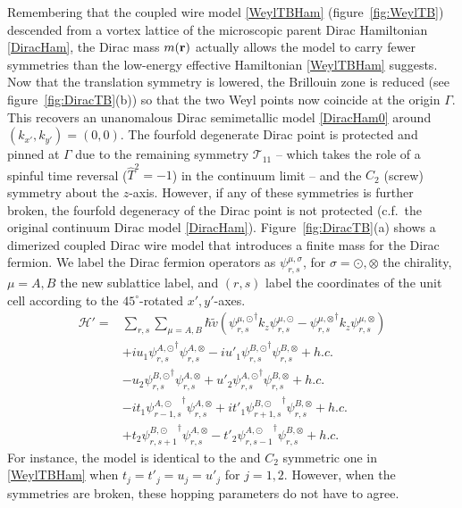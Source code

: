 Remembering that the coupled wire model \eqref{WeylTBHam} (figure~\ref{fig:WeylTB}) descended from a vortex lattice of the microscopic parent Dirac Hamiltonian \eqref{DiracHam}, the Dirac mass $m({\bf r})$ actually allows the model to carry fewer symmetries than the low-energy effective Hamiltonian \eqref{WeylTBHam} suggests. Now that the translation symmetry is lowered, the Brillouin zone is reduced (see figure~\ref{fig:DiracTB}(b)) so that the two Weyl points now coincide at the origin $\Gamma$. This recovers an unanomalous Dirac semimetallic model \eqref{DiracHam0} around $(k_{x'},k_{y'})=(0,0)$. The fourfold degenerate Dirac point is protected and pinned at $\Gamma$ due to the remaining \AFTR symmetry $\mathcal{T}_{11}$ -- which takes the role of a spinful time reversal ($\hat{T}^2=-1$) in the continuum limit -- and the $C_2$ (screw) symmetry about the $z$-axis. However, if any of these symmetries is further broken, the fourfold degeneracy of the Dirac point is not protected (c.f.~the original continuum Dirac model \eqref{DiracHam}). Figure~\ref{fig:DiracTB}(a) shows a dimerized coupled Dirac wire model that introduces a finite mass for the Dirac fermion. We label the Dirac fermion operators as $\psi_{r,s}^{\mu,\sigma}$, for $\sigma=\odot,\otimes$ the chirality, $\mu=A,B$ the new sublattice label, and $(r,s)$ label the coordinates of the unit cell according to the $45^\circ$-rotated $x',y'$-axes. \begin{align}\mathcal{H}'=&\sum_{r,s}\sum_{\mu=A,B}\hbar\tilde{v}\left({\psi_{r,s}^{\mu,\odot}}^\dagger k_z\psi_{r,s}^{\mu,\odot}-{\psi_{r,s}^{\mu,\otimes}}^\dagger k_z\psi_{r,s}^{\mu,\otimes}\right)\nonumber\\&+iu_1{\psi_{r,s}^{A,\odot}}^\dagger\psi_{r,s}^{A,\otimes}-iu'_1{\psi_{r,s}^{B,\odot}}^\dagger\psi_{r,s}^{B,\otimes}+h.c.\nonumber\\&-u_2{\psi_{r,s}^{B,\odot}}^\dagger\psi_{r,s}^{A,\otimes}+u'_2{\psi_{r,s}^{A,\odot}}^\dagger\psi_{r,s}^{B,\otimes}+h.c.\label{DiracTBHam}\\&-it_1{\psi_{r-1,s}^{A,\odot}}^\dagger\psi_{r,s}^{A,\otimes}+it'_1{\psi_{r+1,s}^{B,\odot}}^\dagger\psi_{r,s}^{B,\otimes}+h.c.\nonumber\\&+t_2{\psi_{r,s+1}^{B,\odot}}^\dagger\psi_{r,s}^{A,\otimes}-t'_2{\psi_{r,s-1}^{A,\odot}}^\dagger\psi_{r,s}^{B,\otimes}+h.c.\nonumber\end{align} For instance, the model is identical to the \AFTR and $C_2$ symmetric one in \eqref{WeylTBHam} when $t_j=t'_j=u_j=u'_j$ for $j=1,2$. However, when the symmetries are broken, these hopping parameters do not have to agree.

